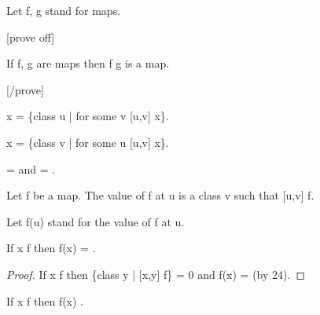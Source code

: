\documentclass[a4paper,draft]{amsproc}
\begin{document}
\begin{forthel}
Let f, g stand for maps.

[prove off]
\begin{theorem}[64]
If f, g are maps then f \circ g is a map.
\end{theorem}
[/prove]

\begin{definition}[65]
\domain x = \{class u | for some v [u,v] \in x\}.
\end{definition}

\begin{definition}[66]
\range x = \{class v | for some u [u,v] \in x\}.
\end{definition}

\begin{theorem}[67]
\domain {} =  and \range {} = .
\end{theorem}


\begin{signature}[68]
Let f be a map. %
The value of f at u is a class v such that [u,v] \in f.
\end{signature}
Let f(u) stand for the value of f at u.

\begin{theorem}[69a]
If x \notin \domain f then f(x) = .
\end{theorem}
\begin{proof}
If x \notin \domain f 
then \{class y | [x,y] \in f\} = 0 and f(x) =  (by 24).
\end{proof}

\begin{theorem}[69b]
If x \in \domain f then f(x) \in {}.
\end{theorem}



\end{forthel}
\end{document}
